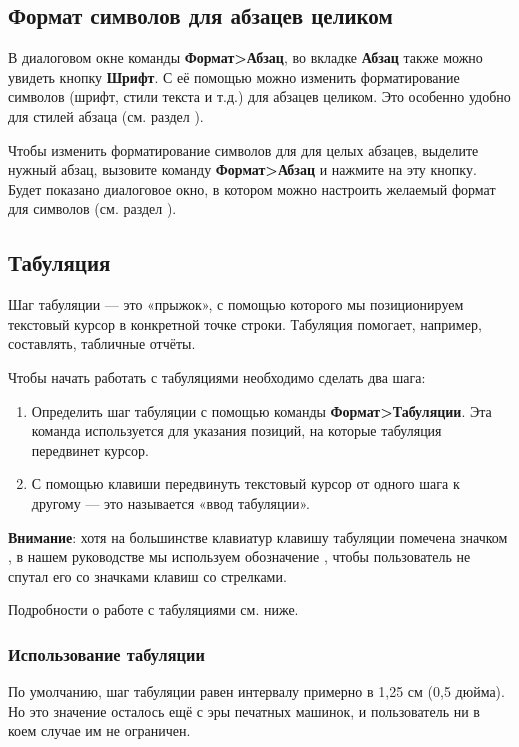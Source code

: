 ﻿\documentclass[a4paper,10pt]{article}
\begin{document}
\subsection{Формат символов для абзацев целиком}
В диалоговом окне команды \textbf{Формат>Абзац}, во вкладке \textbf{Абзац} также можно увидеть кнопку \textbf{Шрифт}. С её помощью можно изменить форматирование символов (шрифт, стили текста и т.д.) для абзацев целиком. Это особенно удобно для стилей абзаца (см. раздел ).

Чтобы изменить форматирование символов для для целых абзацев, выделите нужный абзац, вызовите команду \textbf{Формат>Абзац} и нажмите на эту кнопку. Будет показано диалоговое окно, в котором можно настроить желаемый формат для символов (см. раздел ).

\subsection{Табуляция} \label{sec:табуляция}
Шаг табуляции — это «прыжок», с помощью которого мы позиционируем текстовый курсор в конкретной точке строки. Табуляция помогает, например, составлять, табличные отчёты. 

Чтобы начать работать с табуляциями необходимо сделать два шага:
\begin{enumerate}
 \item Определить шаг табуляции с помощью команды \textbf{Формат>Табуляции}. Эта команда используется для указания позиций, на которые табуляция передвинет курсор.
 \item С помощью клавиши  передвинуть текстовый курсор от одного шага к другому — это называется «ввод табуляции».
\end{enumerate}

\textbf{Внимание}: хотя на большинстве клавиатур клавишу табуляции помечена значком  , в нашем руководстве мы используем обозначение , чтобы  пользователь не спутал его со значками клавиш со стрелками.

Подробности о работе с табуляциями см. ниже.

\subsubsection{Использование табуляции}
По умолчанию, шаг табуляции равен интервалу примерно в 1,25 см (0,5 дюйма). Но это значение осталось ещё с эры печатных машинок, и пользователь ни в коем случае им не ограничен.
\end{document}
